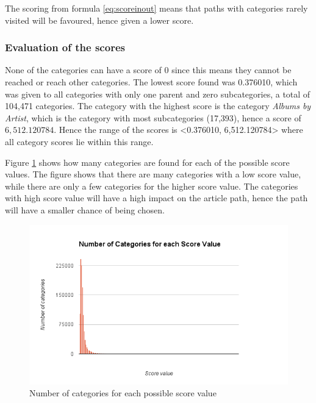 The scoring from formula \ref{eq:scoreinout} means that paths with categories rarely visited will be favoured, hence given a lower score. 

\subsubsection{Evaluation of the scores}
None of the categories can have a score of 0 since this means they cannot be reached or reach other categories. The lowest score found was 0.376010, which was given to all categories with only one parent and zero subcategories, a total of 104,471 categories.  The category with the highest score is the category \emph{Albums by Artist}, which is the category with most subcategories (17,393), hence a score of $6,512.120784$. Hence the range of the scores is <0.376010, 6,512.120784> where all category scores lie within this range. 

Figure \ref{fig:scorevalue} shows how many categories are found for each of the possible score values. The figure shows that there are many categories with a low score value, while there are only a few categories for the higher score value. The categories with high score value will have a high impact on the article path, hence the path will have a smaller chance of being chosen.

\begin{figure}[h]
\centering
\includegraphics[width=\textwidth]{Chapters/Implementation/Grading/Scorevalue_numberofcategories}
\caption{Number of categories for each possible score value}
\label{fig:scorevalue}
\end{figure}



